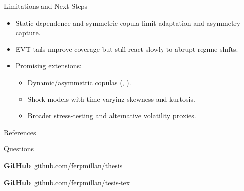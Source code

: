 \documentclass[aspectratio=169,11pt]{beamer}
\newcommand{\thesisbib}{biblo}
\newcommand{\githubicon}{\textbf{GitHub}}
\begin{document}
\begin{frame}{Limitations and Next Steps}
\begin{itemize}\setlength{\itemsep}{1em}
\item Static dependence and symmetric copula limit adaptation and asymmetry capture.
\item EVT tails improve coverage but still react slowly to abrupt regime shifts.
\item Promising extensions:
\begin{itemize}
\item Dynamic/asymmetric copulas (, ).
\item Shock models with time-varying skewness and kurtosis.
\item Broader stress-testing and alternative volatility proxies.
\end{itemize}
\end{itemize}
\end{frame}

\begin{frame}[allowframebreaks]{References}

\nocite{Bollerslev2023,Campbell1997,Christoffersen2012,Tsay2010,Cont2001,Bollerslev1986,Glosten1993,Fernandez1998,mcneil2000estimation,christoffersen1998evaluating,diebold1998evaluating,berkowitz2001testing,diebold1995comparing,jondeau2006copulagarch,patton2006modelling,okimoto2008asymmetric,christoffersen2011joint}

\end{frame}

\begin{frame}[plain]
\centering
\Huge Questions
\vspace{1.2em}

\large \githubicon\ \href{https://github.com/ferpmillan/thesis}{github.com/ferpmillan/thesis}

\vspace{0.5em}

\large \githubicon\ \href{https://github.com/ferpmillan/thesis-tex}{github.com/ferpmillan/tesis-tex}
\end{frame}
\end{document}
